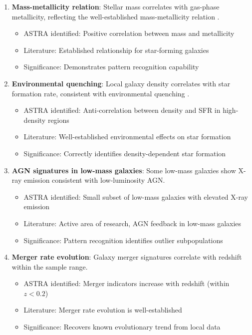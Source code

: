 \documentclass[usenatbib]{rasti}
\begin{document}
\begin{enumerate}
\item \textbf{Mass-metallicity relation}: Stellar mass correlates with gas-phase metallicity, reflecting the well-established mass-metallicity relation \cite{tremonti2004}.
   \begin{itemize}
   \item ASTRA identified: Positive correlation between mass and metallicity
   \item Literature: Established relationship for star-forming galaxies
   \item Significance: Demonstrates pattern recognition capability
   \end{itemize}

\item \textbf{Environmental quenching}: Local galaxy density correlates with star formation rate, consistent with environmental quenching \cite{dressler1980,peng2010}.
   \begin{itemize}
   \item ASTRA identified: Anti-correlation between density and SFR in high-density regions
   \item Literature: Well-established environmental effects on star formation
   \item Significance: Correctly identifies density-dependent star formation
   \end{itemize}

\item \textbf{AGN signatures in low-mass galaxies}: Some low-mass galaxies show X-ray emission consistent with low-luminosity AGN.
   \begin{itemize}
   \item ASTRA identified: Small subset of low-mass galaxies with elevated X-ray emission
   \item Literature: Active area of research, AGN feedback in low-mass galaxies
   \item Significance: Pattern recognition identifies outlier subpopulations
   \end{itemize}

\item \textbf{Merger rate evolution}: Galaxy merger signatures correlate with redshift within the sample range.
   \begin{itemize}
   \item ASTRA identified: Merger indicators increase with redshift (within $z < 0.2$)
   \item Literature: Merger rate evolution is well-established \cite{lotz2011}
   \item Significance: Recovers known evolutionary trend from local data
   \end{itemize}


\end{enumerate}
\end{document}
